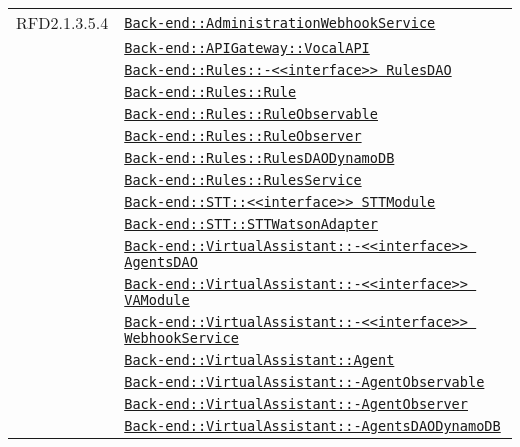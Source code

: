 \begin{longtable}{|>{\centering}m{3cm}|m{10cm}<{\centering}|}
RFD2.1.3.5.4 & \hyperref[Back-end::AdministrationWebhookService]{\texttt{Back-end::AdministrationWebhookService}}\\
& \hyperref[Back-end::APIGateway::VocalAPI]{\texttt{Back-end::APIGateway::VocalAPI}}\\
& \hyperref[Back-end::Rules::<<interface>> RulesDAO]{\texttt{Back-end::Rules::-\linebreak <<interface>> RulesDAO}}\\
& \hyperref[Back-end::Rules::Rule]{\texttt{Back-end::Rules::Rule}}\\
& \hyperref[Back-end::Rules::RuleObservable]{\texttt{Back-end::Rules::RuleObservable}}\\
& \hyperref[Back-end::Rules::RuleObserver]{\texttt{Back-end::Rules::RuleObserver}}\\
& \hyperref[Back-end::Rules::RulesDAODynamoDB]{\texttt{Back-end::Rules::RulesDAODynamoDB}}\\
& \hyperref[Back-end::Rules::RulesService]{\texttt{Back-end::Rules::RulesService}}\\
& \hyperref[Back-end::STT::<<interface>> STTModule]{\texttt{Back-end::STT::<<interface>> STTModule}}\\
& \hyperref[Back-end::STT::STTWatsonAdapter]{\texttt{Back-end::STT::STTWatsonAdapter}}\\
& \hyperref[Back-end::VirtualAssistant::<<interface>> AgentsDAO]{\texttt{Back-end::VirtualAssistant::-\linebreak <<interface>> AgentsDAO}}\\
& \hyperref[Back-end::VirtualAssistant::<<interface>> VAModule]{\texttt{Back-end::VirtualAssistant::-\linebreak <<interface>> VAModule}}\\
& \hyperref[Back-end::VirtualAssistant::<<interface>> WebhookService]{\texttt{Back-end::VirtualAssistant::-\linebreak <<interface>> WebhookService}}\\
& \hyperref[Back-end::VirtualAssistant::Agent]{\texttt{Back-end::VirtualAssistant::Agent}}\\
& \hyperref[Back-end::VirtualAssistant::AgentObservable]{\texttt{Back-end::VirtualAssistant::-\linebreak AgentObservable}}\\
& \hyperref[Back-end::VirtualAssistant::AgentObserver]{\texttt{Back-end::VirtualAssistant::-\linebreak AgentObserver}}\\
& \hyperref[Back-end::VirtualAssistant::AgentsDAODynamoDB]{\texttt{Back-end::VirtualAssistant::-\linebreak AgentsDAODynamoDB}}\\

\end{longtable}
